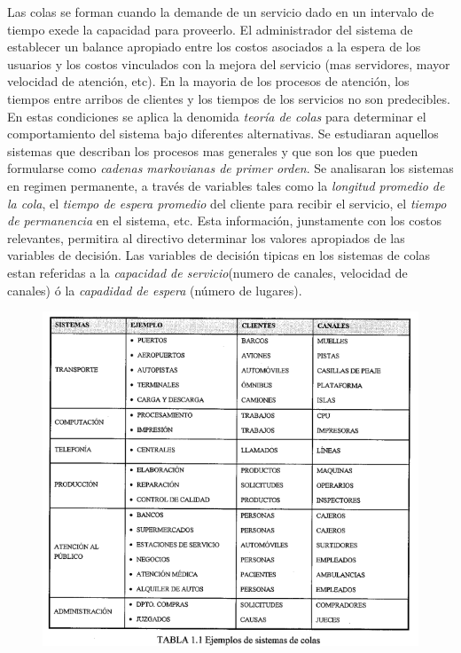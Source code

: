 \documentclass{article}
\begin{document}
Las colas se forman cuando la demande de un servicio dado en un intervalo de tiempo exede la capacidad para proveerlo.
El administrador del sistema de establecer un balance apropiado entre los costos asociados a la espera de los usuarios y los costos vinculados con la mejora del servicio (mas servidores, mayor velocidad de atención, etc).
En la mayoria de los procesos de atención, los tiempos entre arribos de clientes y los tiempos de los servicios no son predecibles. En estas condiciones se aplica la denomida \textit{teoría de colas} para determinar el comportamiento del sistema bajo diferentes alternativas.
Se estudiaran aquellos sistemas que describan los procesos mas generales y que son los que pueden formularse como \textit{cadenas markovianas de primer orden}. Se analisaran los sistemas en regimen permanente, a través de variables tales como la \textit{longitud promedio de la cola}, el \textit{tiempo de espera promedio} del cliente para recibir el servicio, el \textit{tiempo de permanencia} en el sistema, etc. 
Esta información, junstamente con los costos relevantes, permitira al directivo determinar los valores apropiados de las variables de decisión. Las variables de decisión tipicas en los sistemas de colas estan referidas a la \textit{capacidad de servicio}(numero de canales, velocidad de canales) ó la \textit{capadidad de espera} (número de lugares).

    \begin{figure}[h!]
        \includegraphics[width=\linewidth]{imagenes/ejemplo_sistemas_colas.png}
    \end{figure}
\end{document}
